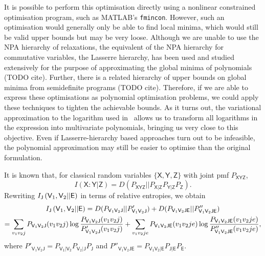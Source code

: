 \documentclass[10pt, a4paper]{article}
\numberwithin{equation}{section} %
\theoremstyle{definition}
\theoremstyle{plain}
\newcommand{\?}{\mathrel{?}} %
\newcommand{\crv}[1]{\mathsf{#1}}
\begin{document}
    It is possible to perform this optimisation directly using a nonlinear constrained optimisation program, such as MATLAB's \verb`fmincon`. However, such an optimisation would generally only be able to find local minima, which would still be valid upper bounds but may be very loose. Although we are unable to use the NPA hierarchy of relaxations, the equivalent of the NPA hierarchy for commutative variables, the Lasserre hierarchy, has been used and studied extensively for the purpose of approximating the global minima of polynomials (TODO cite). Further, there is a related hierarchy of upper bounds on global minima from semidefinite programs (TODO cite). Therefore, if we are able to express these optimisations as polynomial optimisation problems, we could apply these techniques to tighten the achievable bounds. As it turns out, the variational approximation to the logarithm used in~\cite{BFF_QRE} allows us to transform all logarithms in the expression into multivariate polynomials, bringing us very close to this objective. Even if Lasserre-hierarchy based approaches turn out to be infeasible, the polynomial approximation may still be easier to optimise than the original formulation.

    It is known that, for classical random variables \(\{\crv{X}, \crv{Y}, \crv{Z}\}\) with joint pmf \(P_{\crv{XYZ}}\),
    \[ I(\crv{X}:\crv{Y}|\crv{Z}) = D\left(P_{\crv{XYZ}}||P_{\crv{X}|\crv{Z}} P_{\crv{Y}|\crv{Z}} P_{\crv{Z}}\right). \]
    Rewriting \(\splitkey{\crv{V}_1,\crv{V}_2}{\crv{E}}\) in terms of relative entropies, we obtain
    \begin{gather}
      \splitkey{\crv{V}_1,\crv{V}_2}{\crv{E}} =  D(P_{\crv{V}_1\crv{V}_2\crv{J}}||P'_{\crv{V}_1\crv{V}_2\crv{J}})
      + D(P_{\crv{V}_1\crv{V}_2\crv{JE}}||P''_{\crv{V}_1\crv{V}_2\crv{JE}}) \\
                                              = \sum_{v_1v_2j} P_{\crv{V}_1\crv{V}_2\crv{J}}(v_1v_2j) \log \frac{P_{\crv{V}_1\crv{V}_2\crv{J}}(v_1v_2j)}{P'_{\crv{V}_1\crv{V}_2\crv{J}}(v_1v_2j)} + \sum_{v_1v_2je} P_{\crv{V}_1\crv{V}_2\crv{JE}}(v_1v_2je) \log \frac{P_{\crv{V}_1\crv{V}_2\crv{JE}}(v_1v_2je)}{P''_{\crv{V}_1\crv{V}_2\crv{JE}}(v_1v_2je)},
    \end{gather}
    where \(P'_{\crv{V}_1\crv{V}_2\crv{J}} = P_{\crv{V_1|V_2}} P_{\crv{V}_2|\crv{J}} P_{\crv{J}}\) and \(P''_{\crv{V}_1\crv{V}_2\crv{JE}} = P_{\crv{V_1V_2|E}} P_{\crv{J|E}} P_{\crv{E}}\).
\end{document}
